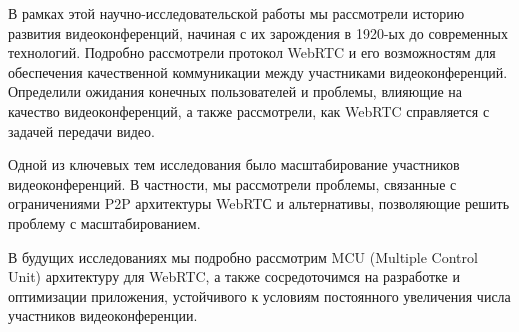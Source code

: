 
В рамках этой научно-исследовательской работы мы рассмотрели историю развития видеоконференций, начиная с их зарождения в 1920-ых до современных технологий. Подробно рассмотрели протокол WebRTC и его возможностям для обеспечения качественной коммуникации между участниками видеоконференций. Определили ожидания конечных пользователей и проблемы, влияющие на качество видеоконференций, а также рассмотрели, как WebRTC справляется с задачей передачи видео.

Одной из ключевых тем исследования было масштабирование участников видеоконференций. В частности, мы рассмотрели проблемы, связанные с ограничениями P2P архитектуры WebRTС и альтернативы, позволяющие решить проблему с масштабированием.

В будущих исследованиях мы подробно рассмотрим MCU (Multiple Control Unit) архитектуру для WebRTC, а также сосредоточимся на разработке и оптимизации приложения, устойчивого к условиям постоянного увеличения числа участников видеоконференции.

\pagebreak